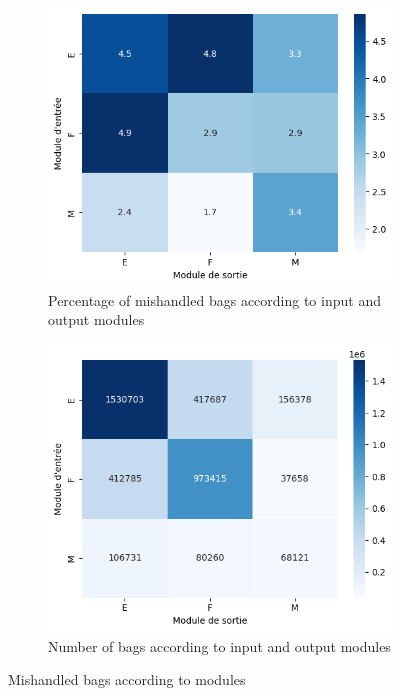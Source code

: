 \documentclass[12pt]{article}
\begin{document}
\FloatBarrier
\begin{figure}[ht]
  \centering
  \begin{subfigure}{0.48\textwidth}
    \includegraphics[width=\linewidth]{percentage of failed per module.png}
    \caption{Percentage of mishandled bags according to input and output modules}
    \label{fig:Percentage of mishandled bags according to input and output modules}
  \end{subfigure}
  \hfill
  \begin{subfigure}{0.48\textwidth}
    \includegraphics[width=\linewidth]{number of bags per module.png}
    \caption{Number of bags according to input and output modules}
    \label{fig:Number of bags according to input and output modules}
  \end{subfigure}
  \caption{Mishandled bags according to modules}
  \label{fig:Mishandled bags according to modules}
\end{figure}
\end{document}
